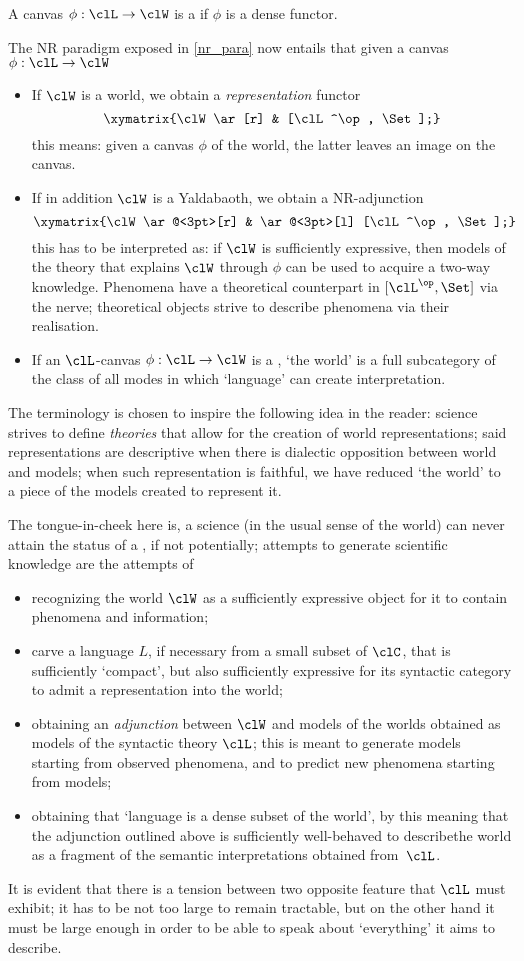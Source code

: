 A canvas $\phi : \clL \to \clW$ is a \emph{\science} if $\phi$ is a dense functor.
\begin{remark}
	The NR paradigm exposed in \autoref{nr_para} now entails that given a canvas $\phi : \clL \to \clW$
	\begin{itemize}
		\item If $\clW$ is a world, we obtain a \emph{representation} functor
		      \[ \xymatrix{\clW \ar[r] & [\clL^\op, \Set];} \]
		      this means: given a canvas $\phi$ of the world, the latter leaves an image on the canvas.
		\item If in addition $\clW$ is a Yaldabaoth, we obtain a NR-adjunction
		      \[\xymatrix{\clW \ar@<3pt>[r] & \ar@<3pt>[l] [\clL^\op, \Set];}\]
		      this has to be interpreted as: if $\clW$ is sufficiently expressive, then models of the theory that explains $\clW$ through $\phi$ can be used to acquire a two-way knowledge. Phenomena have a theoretical counterpart in $[\clL^\op,\Set]$ via the nerve; theoretical objects strive to describe phenomena via their realisation.
		\item If an $\clL$-canvas $\phi : \clL \to \clW$ is a \science, `the world' is a full subcategory of the class of all modes in which `language' can create interpretation.
	\end{itemize}
\end{remark}
The terminology is chosen to inspire the following idea in the reader: science strives to define \emph{theories} that allow for the creation of world representations; said representations are descriptive when there is dialectic opposition between world and models; when such representation is faithful, we have reduced `the world' to a piece of the models created to represent it.

The tongue-in-cheek here is, a science (in the usual sense of the world) can never attain the status of a \science, if not potentially; attempts to generate scientific knowledge are the attempts of
\begin{itemize}
	\item recognizing the world $\clW$ as a sufficiently expressive object for it to contain phenomena and information;
	\item carve a language $L$, if necessary from a small subset of $\clC$, that is sufficiently `compact', but also sufficiently expressive for its syntactic category to admit a representation into the world;
	\item obtaining an \emph{adjunction} between $\clW$ and models of the worlds obtained as models of the syntactic theory $\clL$; this is meant to generate models starting from observed phenomena, and to predict new phenomena starting from models;
	\item obtaining that `language is a dense subset of the world', by this meaning that the adjunction outlined above is sufficiently well-behaved to describethe world as a fragment of the semantic interpretations obtained from~$\clL$.
\end{itemize}
It is evident that there is a tension between two opposite feature that $\clL$ must exhibit; it has to be not too large to remain tractable, but on the other hand it must be large enough in order to be able to speak about `everything' it aims to describe.

